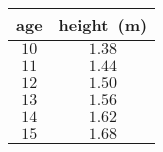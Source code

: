 \begin{tabular}{cc} \toprule
age  & height~(m) \\\midrule
$10$ & $1.38$     \\[6pt]
$11$ & $1.44$     \\[6pt]
$12$ & $1.50$     \\[6pt]
$13$ & $1.56$     \\[6pt]
$14$ & $1.62$     \\[6pt]
$15$ & $1.68$     \\\bottomrule
\end{tabular}
